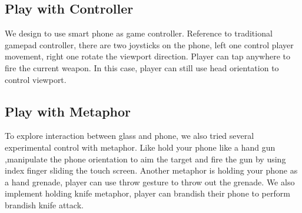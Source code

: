 \documentclass{sigchi}
\begin{document}
\subsection{Play with Controller}
We design to use smart phone as game controller. Reference to traditional gamepad controller, there are two joysticks on the phone, left one control player movement, right one rotate the viewport direction. Player can tap anywhere to fire the current weapon. In this case, player can still use head orientation to control viewport.

\subsection{Play with Metaphor}
To explore interaction between glass and phone, we also tried several experimental control with metaphor. Like hold your phone like a hand gun ,manipulate the phone orientation to aim the target and fire the gun by using index finger sliding the touch screen. Another metaphor is holding your phone as a hand grenade, player can use throw gesture to throw out the grenade. We also implement holding knife metaphor, player can brandish their phone to perform brandish knife attack.


\end{document}
